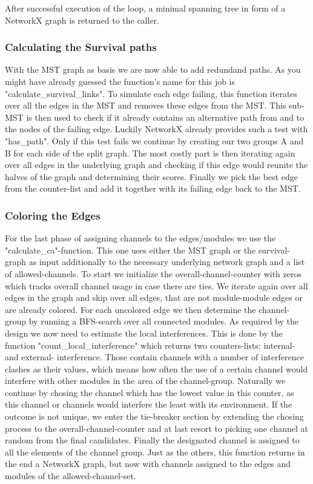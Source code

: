 	After successful execution of the loop, a minimal spanning tree in form of a NetworkX graph is returned to the caller.
	
      \subsubsection{Calculating the Survival paths}
	With the \ac{MST} graph as basis we are now able to add redundand paths. 
	As you might have already guessed the function's name for this job is "calculate\_survival\_links".
	To simulate each edge failing, this function iterates over all the edges in the \ac{MST} and removes these edges from the \ac{MST}.
	This sub-MST is then used to check if it already contains an alternative path from and to the nodes of the failing edge.
	Luckily NetworkX already provides such a test with "has\_path". 
	Only if this test fails we continue by creating our two groups A and B for each side of the split graph.
	The most costly part is then iterating again over all edges in the underlying graph and checking if this edge would reunite the halves of the graph and determining 
	their scores. Finally we pick the best edge from the counter-list and add it together with its failing edge back to the \ac{MST}.
	
      \subsubsection{Coloring the Edges}
	For the last phase of assigning channels to the edges/modules we use the "calculate\_ca"-function. 
	This one uses either the \ac{MST} graph or the survival-graph as input additionally to the necessary underlying network graph and a list of allowed-channels.
	To start we initialize the overall-channel-counter with zeros which tracks overall channel usage in case there are ties.
	We iterate again over all edges in the graph and skip over all edges, that are not module-module edges or are already colored. 
	For each uncolored edge we then determine the channel-group by running a \ac{BFS}-search over all connected modules.
	As required by the design we now need to estimate the local interferences.
	This is done by the function "count\_local\_interference" which returns two counters-lists: internal- and external- interference.
	Those contain channels with a number of interference clashes as their values, 
	which means how often the use of a certain channel would interfere with other modules 
	in the area of the channel-group. Naturally we continue by chosing the channel which has the lowest value in this counter, 
	as this channel or channels would interfere the least 	with its environment. 
	If the outcome is not unique, we enter the tie-breaker section by extending the chosing process to the overall-channel-counter 
	and at last resort to picking one channel at random from the final candidates.
	Finally the designated channel is assigned to all the elements of the channel group.
	Just as the others, this function returns in the end a NetworkX graph, but now with channels assigned to the edges and modules of the allowed-channel-set.	

